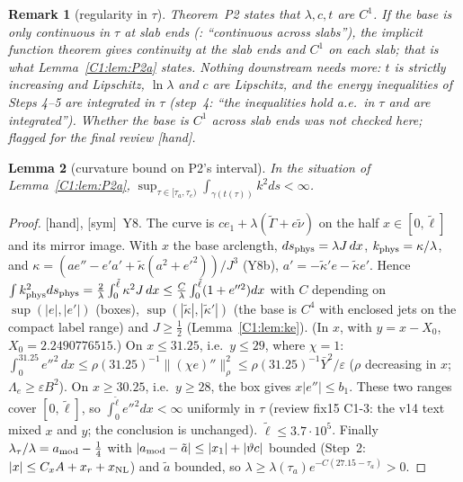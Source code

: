 \documentclass[11pt]{article}
\newtheorem{lemma}{Lemma}[section]\newtheorem{proposition}[lemma]{Proposition}\newtheorem{theorem}[lemma]{Theorem}\newtheorem{remark}[lemma]{Remark}
\newcommand{\fn}[1]{\texttt{\detokenize{#1}}}
\newcommand{\tH}{\textup{[hand]}}\newcommand{\tS}{\textup{[sym]}}\newcommand{\tC}{\textup{[cert]}}\newcommand{\tI}{\textup{[cited]}}\newcommand{\tN}{\textup{[num]}}\newcommand{\tL}{\textup{[Lean]}}
\begin{document}
\begin{remark}[regularity in $\tau$]\label{C1:rem:C1}
Theorem~P2 states that $\lambda,c,t$ are $C^1$. If the base is only continuous in $\tau$ at slab ends (\fn{step4_proof.tex}: ``continuous across slabs''), the implicit function theorem gives continuity at the slab ends and $C^1$ on each slab; that is what Lemma~\ref{C1:lem:P2a} states. Nothing downstream needs more: $t$ is strictly increasing and Lipschitz, $\ln\lambda$ and $c$ are Lipschitz, and the energy inequalities of Steps 4--5 are integrated in $\tau$ (step~4: ``the inequalities hold a.e.\ in $\tau$ and are integrated''). Whether the base is $C^1$ across slab ends was not checked here; flagged for the final review \tH.
\end{remark}

\begin{lemma}[curvature bound on P2's interval]\label{C1:lem:kP2}
In the situation of Lemma~\ref{C1:lem:P2a}, $\sup_{\tau\in[\tau_a,\tau_e)}\int_{\gamma(t(\tau))}k^2ds<\infty$.
\end{lemma}
\begin{proof}\tH, \tS\ Y8. The curve is $ce_1+\lambda(\tilde\Gamma+e\tilde\nu)$ on the half $x\in[0,\tilde\ell]$ and its mirror image. With $x$ the base arclength, $ds_{\rm phys}=\lambda J\,dx$, $k_{\rm phys}=\kappa/\lambda$, and $\kappa=(ae''-e'a'+\tilde\kappa(a^2+e'^2))/J^3$ (Y8b), $a'=-\tilde\kappa'e-\tilde\kappa e'$. Hence $\int k^2_{\rm phys}ds_{\rm phys}=\frac2\lambda\int_0^{\tilde\ell}\kappa^2J\,dx\le\frac{C}{\lambda}\int_0^{\tilde\ell}(1+e''^2)dx$ with $C$ depending on $\sup(|e|,|e'|)$ (boxes), $\sup(|\tilde\kappa|,|\tilde\kappa'|)$ (the base is $C^4$ with enclosed jets on the compact label range) and $J\ge\frac12$ (Lemma~\ref{C1:lem:ke}). (In $x$, with $y=x-X_0$, $X_0=2.2490776515$.) On $x\le31.25$, i.e.\ $y\le29$, where $\chi=1$: $\int_0^{31.25}e''^2\,dx\le\rho(31.25)^{-1}\|(\chi e)''\|_\rho^2\le\rho(31.25)^{-1}\bar Y^2/\varepsilon$ ($\rho$ decreasing in $x$; $\Lambda_e\ge\varepsilon B^2$). On $x\ge30.25$, i.e.\ $y\ge28$, the box gives $x|e''|\le b_1$. These two ranges cover $[0,\tilde\ell]$, so $\int_0^{\tilde\ell}e''^2dx<\infty$ uniformly in $\tau$ (review fix15 C1-3: the v14 text mixed $x$ and $y$; the conclusion is unchanged). $\tilde\ell\le3.7\cdot10^5$. Finally $\lambda_\tau/\lambda=a_{\rm mod}-\frac14$ with $|a_{\rm mod}-\tilde a|\le|x_1|+|\vartheta c|$ bounded (Step~2: $|x|\le C_xA+x_r+x_{\rm NL}$) and $\tilde a$ bounded, so $\lambda\ge\lambda(\tau_a)e^{-C(27.15-\tau_a)}>0$.
\end{proof}
\end{document}
